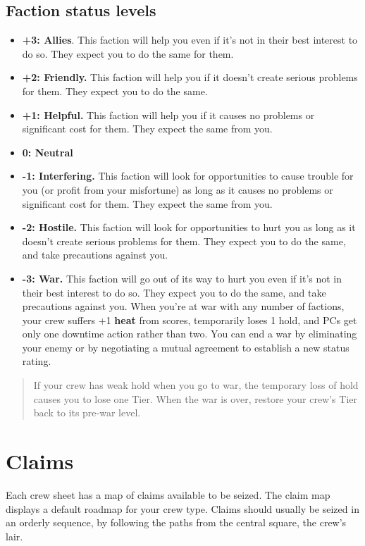 \documentclass[11pt,oneside]{book}
\newcommand{\gameterm}[1]{\textbf{#1}}
\begin{document}
\subsection{Faction status levels}

\begin{itemize}
	\item \textbf{+3: Allies}. This faction will help you even if it’s not in their best interest to do so. They expect you to do the same for them.
	\item \textbf{+2: Friendly.} This faction will help you if it doesn’t create serious problems for them. They expect you to do the same.
	\item \textbf{+1: Helpful.} This faction will help you if it causes no problems or significant cost for them. They expect the same from you.
	\item \textbf{0: Neutral}
	\item \textbf{-1: Interfering.} This faction will look for opportunities to cause trouble for you (or profit from your misfortune) as long as it causes no problems or significant cost for them. They expect the same from you.
	\item \textbf{-2: Hostile.} This faction will look for opportunities to hurt you as long as it doesn’t create serious problems for them. They expect you to do the same, and take precautions against you.
	\item \textbf{-3: War.} This faction will go out of its way to hurt you even if it’s not in their best interest to do so. They expect you to do the same, and take precautions against you. When you’re at war with any number of factions, your crew suffers +1 \gameterm{heat}  from scores, temporarily loses 1 hold, and PCs get only one downtime action rather than two. You can end a war by eliminating your enemy or by negotiating a mutual agreement to establish a new status rating.
\end{itemize}

\begin{quote}
	If your crew has weak hold when you go to war, the temporary loss of hold causes you to lose one Tier. When the war is over, restore your crew’s Tier back to its pre-war level.
\end{quote}

\section{Claims}

Each crew sheet has a map of claims available to be seized. The claim map displays a default roadmap for your crew type. Claims should usually be seized in an orderly sequence, by following the paths from the central square, the crew’s lair.
\end{document}
